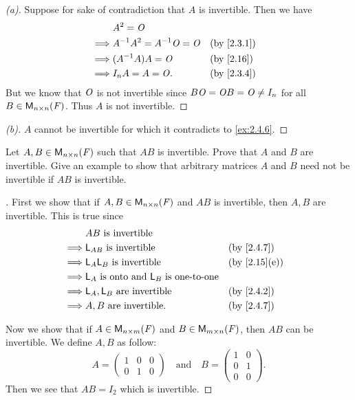\begin{proof}[(a)]
	Suppose for sake of contradiction that \(A\) is invertible.
	Then we have
	\begin{align*}
		         & A^2 = \zm                                     \\
		\implies & A^{-1} A^2 = A^{-1} \zm = \zm &  & \by{2.3.1} \\
		\implies & (A^{-1} A) A = \zm            &  & \by{2.16}  \\
		\implies & I_n A = A = \zm.              &  & \by{2.3.4}
	\end{align*}
	But we know that \(\mathit{O}\) is not invertible since \(B \mathit{O} = \mathit{O} B = \mathit{O} \neq I_n\) for all \(B \in \mathsf{M}_{{n} \times n}({\mathit{F}})\).
	Thus \(A\) is not invertible.
\end{proof}

\begin{proof}[(b)]
	\(A\) cannot be invertible for which it contradicts to \cref{ex:2.4.6}.
\end{proof}

\setcounter{ex}{8}
\begin{ex}\label{ex:2.4.9}
	Let \(A, B \in \mathsf{M}_{{n} \times n}({\mathit{F}})\) such that \(AB\) is invertible.
	Prove that \(A\) and \(B\) are invertible.
	Give an example to show that arbitrary matrices \(A\) and \(B\) need not be invertible if \(AB\) is invertible.
\end{ex}

\begin{proof}[]
	First we show that if \(A, B \in \mathsf{M}_{{n} \times n}({\mathit{F}})\) and \(AB\) is invertible, then \(A, B\) are invertible.
	This is true since
	\begin{align*}
		         & AB \text{ is invertible}                                               \\
		\implies & \L_{AB} \text{ is invertible}                        &  & \by{2.4.7}   \\
		\implies & \L_A \L_B \text{ is invertible}                      &  & \by{2.15}[e] \\
		\implies & \L_A \text{ is onto and } \L_B \text{ is one-to-one}                   \\
		\implies & \L_A, \L_B \text{ are invertible}                    &  & \by{2.4.2}   \\
		\implies & A, B \text{ are invertible}.                         &  & \by{2.4.7}
	\end{align*}

	Now we show that if \(A \in \mathsf{M}_{{n} \times m}({\mathit{F}})\) and \(B \in \mathsf{M}_{{m} \times n}({\mathit{F}})\), then \(AB\) can be invertible.
	We define \(A, B\) as follow:
	\[
		A = \begin{pmatrix}
			1 & 0 & 0 \\
			0 & 1 & 0
		\end{pmatrix} \quad \text{and} \quad B = \begin{pmatrix}
			1 & 0 \\
			0 & 1 \\
			0 & 0
		\end{pmatrix}.
	\]
	Then we see that \(AB = I_2\) which is invertible.
\end{proof}

